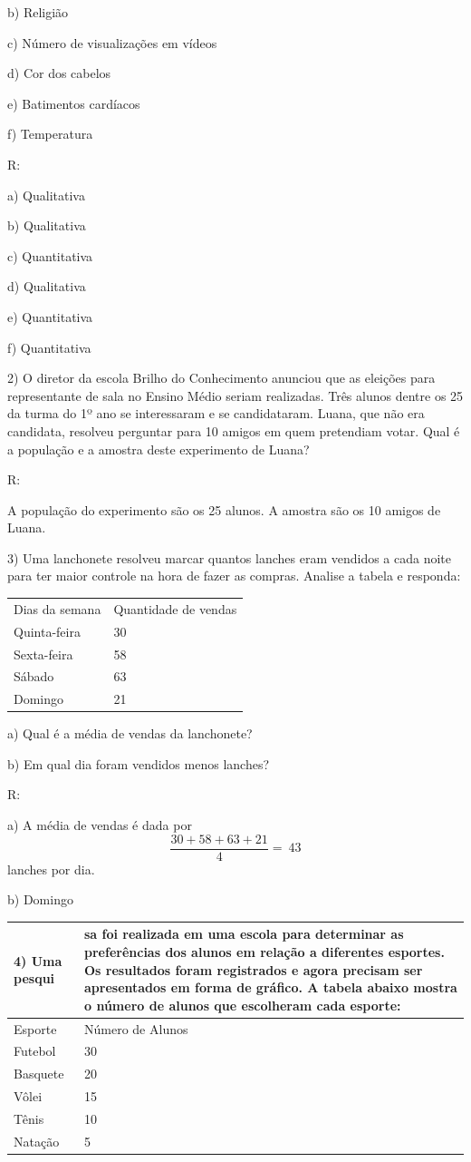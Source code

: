 b) Religião

c) Número de visualizações em vídeos

d) Cor dos cabelos

e) Batimentos cardíacos~

f) Temperatura

R:

a) Qualitativa

b) Qualitativa

c) Quantitativa

d) Qualitativa

e) Quantitativa

f) Quantitativa

2) O diretor da escola Brilho do Conhecimento anunciou que as eleições
para representante de sala no Ensino Médio seriam realizadas. Três
alunos dentre os 25 da turma do 1º ano se interessaram e se
candidataram. Luana, que não era candidata, resolveu perguntar para 10
amigos em quem pretendiam votar. Qual é a população e a amostra deste
experimento de Luana?

R:

A população do experimento são os 25 alunos. A amostra são os 10 amigos
de Luana.

3) Uma lanchonete resolveu marcar quantos lanches eram vendidos a cada
noite para ter maior controle na hora de fazer as compras. Analise a
tabela e responda:

\begin{longtable}[]{@{}ll@{}}
\toprule
\endhead
Dias da semana & Quantidade de vendas\tabularnewline
Quinta-feira~ & 30\tabularnewline
Sexta-feira & 58\tabularnewline
Sábado & 63\tabularnewline
Domingo & 21\tabularnewline
\bottomrule
\end{longtable}

a) Qual é a média de vendas da lanchonete?

b) Em qual dia foram vendidos menos lanches?

R:

a) A média de vendas é dada por \[\frac{30 + 58 + 63 + 21}{4} = \ 43\]
lanches por dia.

b) Domingo

\begin{longtable}[]{@{}ll@{}}
\toprule
4) Uma pesqui & sa foi realizada em uma escola para determinar as
preferências dos alunos em relação a diferentes esportes. Os resultados
foram registrados e agora precisam ser apresentados em forma de gráfico.
A tabela abaixo mostra o número de alunos que escolheram cada
esporte:\tabularnewline
\midrule
\endhead
Esporte & Número de Alunos\tabularnewline
Futebol & 30\tabularnewline
Basquete & 20\tabularnewline
Vôlei & 15\tabularnewline
Tênis & 10\tabularnewline
Natação & 5\tabularnewline
\bottomrule
\end{longtable}

